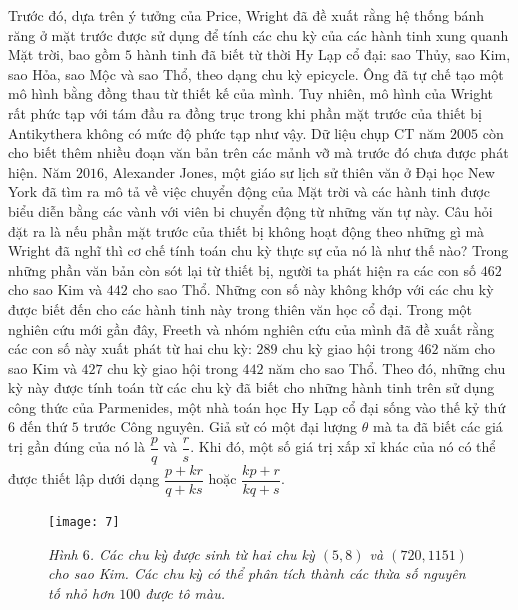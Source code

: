 \begin{multicols}{2}
	\vskip 0.1cm
	Trước đó, dựa trên ý tưởng của Price, Wright đã đề xuất rằng hệ thống bánh răng ở mặt trước được sử dụng để tính các chu kỳ của các hành tinh xung quanh Mặt trời, bao gồm $5$ hành tinh đã biết từ thời Hy Lạp cổ đại: sao Thủy, sao Kim, sao Hỏa, sao Mộc và sao Thổ, theo dạng chu kỳ epicycle. Ông đã tự chế tạo một mô hình bằng đồng thau từ thiết kế của mình. Tuy nhiên, mô hình của Wright rất phức tạp với tám đầu ra đồng trục trong khi phần mặt trước của thiết bị Antikythera không có mức độ phức tạp như vậy. Dữ liệu chụp CT năm $2005$ còn cho biết thêm nhiều đoạn văn bản trên các mảnh vỡ mà trước đó chưa được phát hiện. Năm $2016$, Alexander Jones, một giáo sư lịch sử thiên văn ở Đại học New York đã tìm ra mô tả về việc chuyển động của Mặt trời và các hành tinh được biểu diễn bằng các vành với viên bi chuyển động từ những văn tự này. Câu hỏi đặt ra là nếu phần mặt trước của thiết bị không hoạt động theo những gì mà Wright đã nghĩ thì cơ chế tính toán chu kỳ thực sự của nó là như thế nào?
	\vskip 0.1cm
	Trong những phần văn bản còn sót lại từ thiết bị, người ta phát hiện ra các con số $462$ cho sao Kim và $442$ cho sao Thổ. Những con số này không khớp với các chu kỳ được biết đến cho các hành tinh này trong thiên văn học cổ đại. Trong một nghiên cứu mới gần đây, Freeth và nhóm nghiên cứu của mình đã đề xuất rằng các con số này xuất phát từ hai chu kỳ: $289$ chu kỳ giao hội trong $462$ năm cho sao Kim và $427$ chu kỳ giao hội trong $442$ năm cho sao Thổ. Theo đó, những chu kỳ này được tính toán từ các chu kỳ đã biết cho những hành tinh trên sử dụng công thức của Parmenides, một nhà toán học Hy Lạp cổ đại sống vào thế kỷ thứ $6$ đến thứ $5$ trước Công nguyên. Giả sử có một đại lượng $\theta$ mà ta đã biết các giá trị gần đúng của nó là $\dfrac{p}{q}$ và $\dfrac{r}{s}$. Khi đó, một số giá trị xấp xỉ khác của nó có thể được thiết lập dưới dạng $\dfrac{p+kr}{q + ks}$ hoặc $\dfrac{kp + r}{kq + s}$.
	\begin{figure}[H]
		\vspace*{-5pt}
		\centering
		\captionsetup{labelformat= empty, justification=centering}
		\texttt{[image: 7]}
		\caption{\small\textit{\color{lichsutoanhoc}Hình $6$. Các chu kỳ được sinh từ hai chu kỳ $(5,8)$ và $(720,1151)$ cho sao Kim. Các chu kỳ có thể phân tích thành các thừa số nguyên tố nhỏ hơn $100$ được tô màu.}}
		\vspace*{-10pt}
	\end{figure}

\end{multicols}
